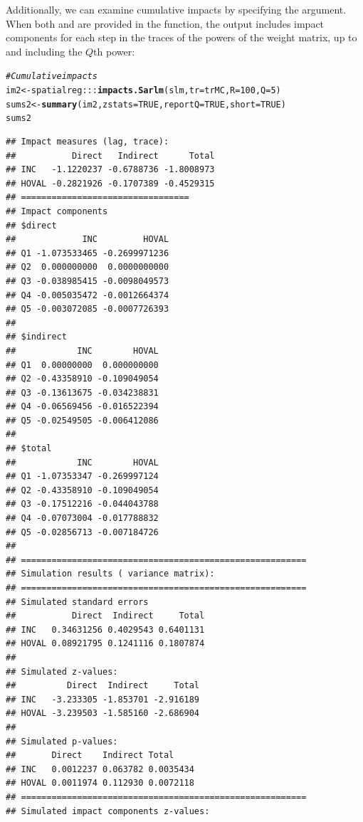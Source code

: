 \documentclass[english,12pt]{book}\usepackage[]{graphicx}\usepackage[]{xcolor}
\makeatletter
\newcommand{\hlnum}[1]{\textcolor[rgb]{0.686,0.059,0.569}{#1}}%
\newcommand{\hlcom}[1]{\textcolor[rgb]{0.678,0.584,0.686}{\textit{#1}}}%
\newcommand{\hlopt}[1]{\textcolor[rgb]{0,0,0}{#1}}%
\newcommand{\hldef}[1]{\textcolor[rgb]{0.345,0.345,0.345}{#1}}%
\newcommand{\hlkwb}[1]{\textcolor[rgb]{0.69,0.353,0.396}{#1}}%
\newcommand{\hlkwc}[1]{\textcolor[rgb]{0.333,0.667,0.333}{#1}}%
\newcommand{\hlkwd}[1]{\textcolor[rgb]{0.737,0.353,0.396}{\textbf{#1}}}%
\newenvironment{kframe}{%
 \def\at@end@of@kframe{}%
 \ifinner\ifhmode%
  \def\at@end@of@kframe{\end{minipage}}%
  \begin{minipage}{\columnwidth}%
 \fi\fi%
 \def\FrameCommand##1{\hskip\@totalleftmargin \hskip-\fboxsep
 \colorbox{shadecolor}{##1}\hskip-\fboxsep
     \hskip-\linewidth \hskip-\@totalleftmargin \hskip\columnwidth}%
 \MakeFramed {\advance\hsize-\width
   \@totalleftmargin\z@ \linewidth\hsize
   \@setminipage}}%
 {\par\unskip\endMakeFramed%
 \at@end@of@kframe}
\newenvironment{knitrout}{}{} %
\makeatother
\begin{document}
Additionally, we can examine cumulative impacts by specifying the  argument. When both  and  are provided in the  function, the output includes impact components for each step in the traces of the powers of the weight matrix, up to and including the $Q$th power:
\begin{knitrout}
\color{fgcolor}\begin{kframe}
\begin{alltt}
\hlcom{# Cumulative impacts}
\hldef{im2}   \hlkwb{<-} \hldef{spatialreg}\hlopt{:::}\hlkwd{impacts.Sarlm}\hldef{(slm,} \hlkwc{tr} \hldef{= trMC,} \hlkwc{R} \hldef{=} \hlnum{100}\hldef{,} \hlkwc{Q} \hldef{=} \hlnum{5}\hldef{)}
\hldef{sums2} \hlkwb{<-} \hlkwd{summary}\hldef{(im2,} \hlkwc{zstats} \hldef{=} \hlnum{TRUE}\hldef{,} \hlkwc{reportQ} \hldef{=} \hlnum{TRUE}\hldef{,} \hlkwc{short} \hldef{=}  \hlnum{TRUE}\hldef{)}
\hldef{sums2}
\end{alltt}
\begin{verbatim}
## Impact measures (lag, trace):
##           Direct   Indirect      Total
## INC   -1.1220237 -0.6788736 -1.8008973
## HOVAL -0.2821926 -0.1707389 -0.4529315
## =================================
## Impact components
## $direct
##             INC         HOVAL
## Q1 -1.073533465 -0.2699971236
## Q2  0.000000000  0.0000000000
## Q3 -0.038985415 -0.0098049573
## Q4 -0.005035472 -0.0012664374
## Q5 -0.003072085 -0.0007726393
## 
## $indirect
##            INC        HOVAL
## Q1  0.00000000  0.000000000
## Q2 -0.43358910 -0.109049054
## Q3 -0.13613675 -0.034238831
## Q4 -0.06569456 -0.016522394
## Q5 -0.02549505 -0.006412086
## 
## $total
##            INC        HOVAL
## Q1 -1.07353347 -0.269997124
## Q2 -0.43358910 -0.109049054
## Q3 -0.17512216 -0.044043788
## Q4 -0.07073004 -0.017788832
## Q5 -0.02856713 -0.007184726
## 
## ========================================================
## Simulation results ( variance matrix):
## ========================================================
## Simulated standard errors
##           Direct  Indirect     Total
## INC   0.34631256 0.4029543 0.6401131
## HOVAL 0.08921795 0.1241116 0.1807874
## 
## Simulated z-values:
##          Direct  Indirect     Total
## INC   -3.233305 -1.853701 -2.916189
## HOVAL -3.239503 -1.585160 -2.686904
## 
## Simulated p-values:
##       Direct    Indirect Total    
## INC   0.0012237 0.063782 0.0035434
## HOVAL 0.0011974 0.112930 0.0072118
## ========================================================
## Simulated impact components z-values:

\end{verbatim}
\end{kframe}
\end{knitrout}
\end{document}
